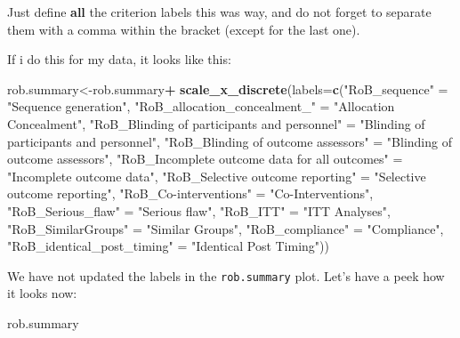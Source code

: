 \documentclass[]{book}
\newenvironment{Shaded}{\begin{snugshade}}{\end{snugshade}}
\newcommand{\KeywordTok}[1]{\textcolor[rgb]{0.13,0.29,0.53}{\textbf{#1}}}
\newcommand{\DataTypeTok}[1]{\textcolor[rgb]{0.13,0.29,0.53}{#1}}
\newcommand{\StringTok}[1]{\textcolor[rgb]{0.31,0.60,0.02}{#1}}
\newcommand{\OperatorTok}[1]{\textcolor[rgb]{0.81,0.36,0.00}{\textbf{#1}}}
\newcommand{\NormalTok}[1]{#1}
\theoremstyle{definition}
\theoremstyle{definition}
\theoremstyle{definition}
\theoremstyle{remark}
\begin{document}
Just define \textbf{all} the criterion labels this was way, and do not
forget to separate them with a comma within the bracket (except for the
last one).

If i do this for my data, it looks like this:

\begin{Shaded}
\begin{Highlighting}[]
\NormalTok{rob.summary<-rob.summary}\OperatorTok{+}
\KeywordTok{scale_x_discrete}\NormalTok{(}\DataTypeTok{labels=}\KeywordTok{c}\NormalTok{(}\StringTok{"RoB_sequence"}\NormalTok{ =}\StringTok{ "Sequence generation"}\NormalTok{, }
                            \StringTok{"RoB_allocation_concealment_"}\NormalTok{ =}\StringTok{ "Allocation Concealment"}\NormalTok{,}
                            \StringTok{"RoB_Blinding of participants and personnel"}\NormalTok{ =}\StringTok{ "Blinding of participants and personnel"}\NormalTok{,}
                            \StringTok{"RoB_Blinding of outcome assessors"}\NormalTok{ =}\StringTok{ "Blinding of outcome assessors"}\NormalTok{,}
                            \StringTok{"RoB_Incomplete outcome data for all outcomes"}\NormalTok{ =}\StringTok{ "Incomplete outcome data"}\NormalTok{,}
                            \StringTok{"RoB_Selective outcome reporting"}\NormalTok{ =}\StringTok{ "Selective outcome reporting"}\NormalTok{,}
                            \StringTok{"RoB_Co-interventions"}\NormalTok{ =}\StringTok{ "Co-Interventions"}\NormalTok{,}
                            \StringTok{"RoB_Serious_flaw"}\NormalTok{ =}\StringTok{ "Serious flaw"}\NormalTok{,}
                            \StringTok{"RoB_ITT"}\NormalTok{ =}\StringTok{ "ITT Analyses"}\NormalTok{,}
                            \StringTok{"RoB_SimilarGroups"}\NormalTok{ =}\StringTok{ "Similar Groups"}\NormalTok{,}
                            \StringTok{"RoB_compliance"}\NormalTok{ =}\StringTok{ "Compliance"}\NormalTok{,}
                            \StringTok{"RoB_identical_post_timing"}\NormalTok{ =}\StringTok{ "Identical Post Timing"}\NormalTok{))}
\end{Highlighting}
\end{Shaded}

We have not updated the labels in the \texttt{rob.summary} plot. Let's
have a peek how it looks now:

\begin{Shaded}
\begin{Highlighting}[]
\NormalTok{rob.summary}
\end{Highlighting}
\end{Shaded}
\end{document}
